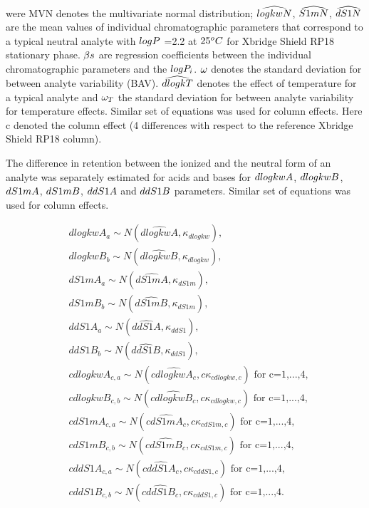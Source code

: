 \documentclass[
]{article}
\begin{document}
were MVN denotes the multivariate normal distribution;
\(\small \widehat{logkwN}\), \(\small \widehat{S1mN}\),
\(\small \widehat{dS1N}\) are the mean values of individual
chromatographic parameters that correspond to a typical neutral analyte
with \(\small logP\) =2.2 at \(\small 25^oC\) for Xbridge Shield RP18
stationary phase. \(\small \beta s\) are regression coefficients between
the individual chromatographic parameters and the \(\small logP_i\).
\(\small \omega\) denotes the standard deviation for between analyte
variability (BAV). \(\small \widehat{dlogkT}\) denotes the effect of
temperature for a typical analyte and \(\small \omega_T\) the standard
deviation for between analyte variability for temperature effects.
Similar set of equations was used for column effects. Here c denoted the
column effect (4 differences with respect to the reference Xbridge
Shield RP18 column).

The difference in retention between the ionized and the neutral form of
an analyte was separately estimated for acids and bases for
\(\small dlogkwA\), \(\small dlogkwB\), \(\small dS1mA\),
\(\small dS1mB\), \(\small ddS1A\) and \(\small ddS1B\) parameters.
Similar set of equations was used for column effects.

\[
\begin{aligned}
& dlogkwA_a \sim N(\widehat{dlogkwA}, \kappa_{dlogkw}), \\
& dlogkwB_b \sim N(\widehat{dlogkwB}, \kappa_{dlogkw}), \\
& dS1mA_a \sim N(\widehat{dS1mA}, \kappa_{dS1m}), \\
& dS1mB_b \sim N(\widehat{dS1mB}, \kappa_{dS1m}), \\
& ddS1A_a \sim N(\widehat{ddS1A}, \kappa_{ddS1}), \\
& ddS1B_b \sim N(\widehat{ddS1B}, \kappa_{ddS1}), \\
& cdlogkwA_{c,a} \sim N(\widehat{cdlogkwA_{c}}, c\kappa_{cdlogkw,c}) \text{ for c=1,...,4}, \\
& cdlogkwB_{c,b} \sim N(\widehat{cdlogkwB_{c}}, c\kappa_{cdlogkw,c}) \text{ for c=1,...,4}, \\
& cdS1mA_{c,a} \sim N(\widehat{cdS1mA_{c}}, c\kappa_{cdS1m,c}) \text{ for c=1,...,4}, \\
& cdS1mB_{c,b} \sim N(\widehat{cdS1mB_{c}}, c\kappa_{cdS1m,c}) \text{ for c=1,...,4}, \\
& cddS1A_{c,a} \sim N(\widehat{cddS1A_{c}}, c\kappa_{cddS1,c}) \text{ for c=1,...,4}, \\
& cddS1B_{c,b} \sim N(\widehat{cddS1B_{c}}, c\kappa_{cddS1,c}) \text{ for c=1,...,4}. \\
\end{aligned}
\]
\end{document}
